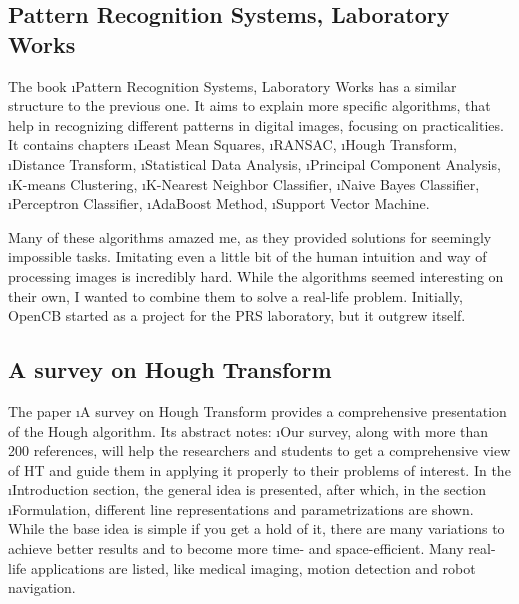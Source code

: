 \subsection{Pattern Recognition Systems, Laboratory Works}

The book \i{Pattern Recognition Systems, Laboratory Works}\cite{prs_labs} has a similar structure to the previous one. It aims to explain more specific algorithms, that help in recognizing different patterns in digital images, focusing on practicalities. It contains chapters \i{Least Mean Squares}, \i{RANSAC}, \i{Hough Transform}, \i{Distance Transform}, \i{Statistical Data Analysis}, \i{Principal Component Analysis}, \i{K-means Clustering}, \i{K-Nearest Neighbor Classifier}, \i{Naive Bayes Classifier}, \i{Perceptron Classifier}, \i{AdaBoost Method}, \i{Support Vector Machine}. 

Many of these algorithms amazed me, as they provided solutions for seemingly impossible tasks. Imitating even a little bit of the human intuition and way of processing images is incredibly hard. While the algorithms seemed interesting on their own, I wanted to combine them to solve a real-life problem. Initially, OpenCB started as a project for the PRS laboratory, but it outgrew itself.



\subsection{A survey on Hough Transform}

The paper \i{A survey on Hough Transform}\cite{hough_survey} provides a comprehensive presentation of the Hough algorithm. Its abstract notes: \i{Our survey, along with more than 200 references, will help the researchers and students to get a comprehensive view of HT and guide them in applying it properly to their problems of interest}. In the \i{Introduction} section, the general idea is presented, after which, in the section \i{Formulation}, different line representations and parametrizations are shown. While the base idea is simple if you get a hold of it, there are many variations to achieve better results and to become more time- and space-efficient. Many real-life applications are listed, like medical imaging, motion detection and robot navigation.




